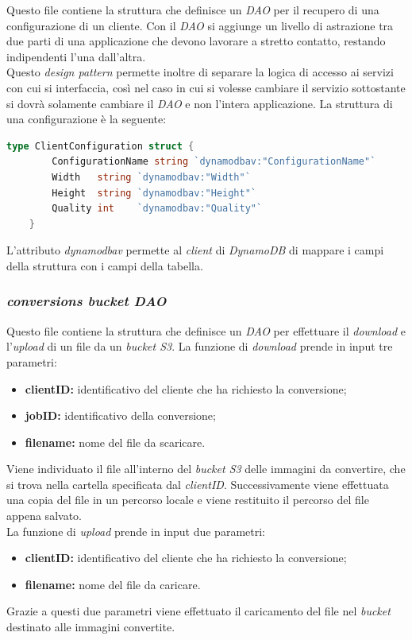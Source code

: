 Questo file contiene la struttura che definisce un \emph{DAO} per il recupero di
una configurazione di un cliente. Con il \emph{DAO} si aggiunge un livello di
astrazione tra due parti di una applicazione che devono lavorare a stretto
contatto, restando indipendenti l'una dall'altra.\\
Questo \emph{design pattern} permette inoltre di separare la logica di accesso
ai servizi con cui si interfaccia, così nel caso in cui si volesse cambiare il
servizio sottostante si dovrà solamente cambiare il \emph{DAO} e non l'intera
applicazione. La struttura di una configurazione è la seguente:
\begin{lstlisting}[language=go]
type ClientConfiguration struct {
        ConfigurationName string `dynamodbav:"ConfigurationName"`
        Width   string `dynamodbav:"Width"`
        Height  string `dynamodbav:"Height"`
        Quality int    `dynamodbav:"Quality"`
    }
\end{lstlisting}
L'attributo \emph{dynamodbav} permette al \emph{client} di \emph{DynamoDB} di
mappare i campi della struttura con i campi della tabella.\\

\subsubsection{\emph{conversions bucket DAO}}

Questo file contiene la struttura che definisce un \emph{DAO} per effettuare il
\emph{download} e l'\emph{upload} di un file da un \emph{bucket S3}. La funzione
di \emph{download} prende in input tre parametri:
\begin{itemize}
      \item \textbf{clientID:} identificativo del cliente che ha richiesto la
            conversione;
      \item \textbf{jobID:} identificativo della conversione;
      \item \textbf{filename:} nome del file da scaricare.
\end{itemize}

Viene individuato il file all'interno del \emph{bucket S3} delle immagini da convertire, che si trova nella
cartella specificata dal \emph{clientID}. Successivamente viene effettuata una
copia del file in un percorso locale e viene restituito il percorso del file
appena salvato.\\

La funzione di \emph{upload} prende in input due parametri:
\begin{itemize}
      \item \textbf{clientID:} identificativo del cliente che ha richiesto la
            conversione;
      \item \textbf{filename:} nome del file da caricare.
\end{itemize}
Grazie a questi due parametri viene effettuato il caricamento del file nel
\emph{bucket} destinato alle immagini convertite.

